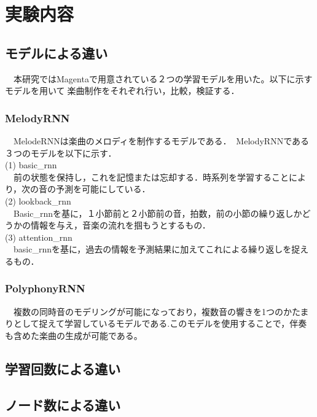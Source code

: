 \chapter{実験内容}
\section{モデルによる違い}
　本研究ではMagentaで用意されている２つの学習モデルを用いた。以下に示すモデルを用いて楽曲制作をそれぞれ行い，比較，検証する．\\

\subsection{MelodyRNN}
　MelodeRNNは楽曲のメロディを制作するモデルである．MelodyRNNである３つのモデルを以下に示す．\\
(1)	basic_rnn\\
　前の状態を保持し，これを記憶または忘却する．時系列を学習することにより，次の音の予測を可能にしている．\\
(2)	lookback_rnn\\
　Basic_rnnを基に，１小節前と２小節前の音，拍数，前の小節の繰り返しかどうかの情報を与え，音楽の流れを掴もうとするもの．\\
(3)	attention_rnn\\
　basic_rnnを基に，過去の情報を予測結果に加えてこれによる繰り返しを捉えるもの．\\

\subsection{PolyphonyRNN}
　複数の同時音のモデリングが可能になっており，複数音の響きを1つのかたまりとして捉えて学習しているモデルである.このモデルを使用することで，伴奏も含めた楽曲の生成が可能である。\\

\section{学習回数による違い}
\section{ノード数による違い}